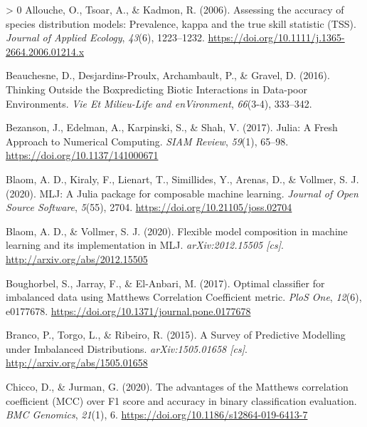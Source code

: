 \documentclass[11pt]{article}
\newlength{\cslhangindent}
\newenvironment{CSLReferences}[3] %
 {%
  \setlength{\parindent}{0pt}
  \ifodd #1 \everypar{\setlength{\hangindent}{\cslhangindent}}\ignorespaces\fi
  \ifnum #2 > 0
  \setlength{\parskip}{#2\baselineskip}
  \fi
 }%
 {}
\begin{document}
\hypertarget{refs}{}
\begin{CSLReferences}{1}{0}
\leavevmode\hypertarget{ref-Allouche2006AssAcc}{}%
Allouche, O., Tsoar, A., \& Kadmon, R. (2006). Assessing the accuracy of
species distribution models: Prevalence, kappa and the true skill
statistic (TSS). \emph{Journal of Applied Ecology}, \emph{43}(6),
1223--1232. \url{https://doi.org/10.1111/j.1365-2664.2006.01214.x}

\leavevmode\hypertarget{ref-Beauchesne2016ThiOut}{}%
Beauchesne, D., Desjardins-Proulx, Archambault, P., \& Gravel, D.
(2016). Thinking Outside the Boxpredicting Biotic Interactions in
Data-poor Environments. \emph{Vie Et Milieu-Life and enVironment},
\emph{66}(3-4), 333--342.

\leavevmode\hypertarget{ref-Bezanson2017JulFre}{}%
Bezanson, J., Edelman, A., Karpinski, S., \& Shah, V. (2017). Julia: A
Fresh Approach to Numerical Computing. \emph{SIAM Review}, \emph{59}(1),
65--98. \url{https://doi.org/10.1137/141000671}

\leavevmode\hypertarget{ref-Blaom2020MljJul}{}%
Blaom, A. D., Kiraly, F., Lienart, T., Simillides, Y., Arenas, D., \&
Vollmer, S. J. (2020). MLJ: A Julia package for composable machine
learning. \emph{Journal of Open Source Software}, \emph{5}(55), 2704.
\url{https://doi.org/10.21105/joss.02704}

\leavevmode\hypertarget{ref-Blaom2020FleMod}{}%
Blaom, A. D., \& Vollmer, S. J. (2020). Flexible model composition in
machine learning and its implementation in MLJ. \emph{arXiv:2012.15505
{[}cs{]}}. \url{http://arxiv.org/abs/2012.15505}

\leavevmode\hypertarget{ref-Boughorbel2017OptCla}{}%
Boughorbel, S., Jarray, F., \& El-Anbari, M. (2017). Optimal classifier
for imbalanced data using Matthews Correlation Coefficient metric.
\emph{PloS One}, \emph{12}(6), e0177678.
\url{https://doi.org/10.1371/journal.pone.0177678}

\leavevmode\hypertarget{ref-Branco2015SurPre}{}%
Branco, P., Torgo, L., \& Ribeiro, R. (2015). A Survey of Predictive
Modelling under Imbalanced Distributions. \emph{arXiv:1505.01658
{[}cs{]}}. \url{http://arxiv.org/abs/1505.01658}

\leavevmode\hypertarget{ref-Chicco2020AdvMat}{}%
Chicco, D., \& Jurman, G. (2020). The advantages of the Matthews
correlation coefficient (MCC) over F1 score and accuracy in binary
classification evaluation. \emph{BMC Genomics}, \emph{21}(1), 6.
\url{https://doi.org/10.1186/s12864-019-6413-7}


\end{CSLReferences}
\end{document}
